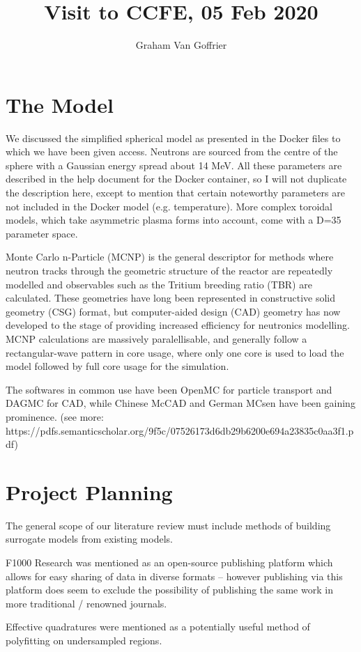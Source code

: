 \documentclass[12pt]{article}
\title{Visit to CCFE, 05 Feb 2020}
\author{Graham Van Goffrier}
\begin{document}
\maketitle




\section{The Model}

We discussed the simplified spherical model as presented in the Docker files to which we have been given access. Neutrons are sourced from the centre of the sphere with a Gaussian energy spread about 14 MeV. All these parameters are described in the help document for the Docker container, so I will not duplicate the description here, except to mention that certain noteworthy parameters are not included in the Docker model (e.g. temperature). More complex toroidal models, which take asymmetric plasma forms into account, come with a D=35 parameter space.

Monte Carlo n-Particle (MCNP) is the general descriptor for methods where neutron tracks through the geometric structure of the reactor are repeatedly modelled and observables such as the Tritium breeding ratio (TBR) are calculated. These geometries have long been represented in constructive solid geometry (CSG) format, but computer-aided design (CAD) geometry has now developed to the stage of providing increased efficiency for neutronics modelling. MCNP calculations are massively paralellisable, and generally follow a rectangular-wave pattern in core usage, where only one core is used to load the model followed by full core usage for the simulation.

The softwares in common use have been OpenMC for particle transport and DAGMC for CAD, while Chinese McCAD and German MCsen have been gaining prominence.
(see more: https://pdfs.semanticscholar.org/9f5c/07526173d6db29b6200e694a23835c0aa3f1.pdf)


\section{Project Planning}

The general scope of our literature review must include methods of building surrogate models from existing models.

F1000 Research was mentioned as an open-source publishing platform which allows for easy sharing of data in diverse formats -- however publishing via this platform does seem to exclude the possibility of publishing the same work in more traditional / renowned journals.

Effective quadratures were mentioned as a potentially useful method of polyfitting on undersampled regions.
\end{document}

